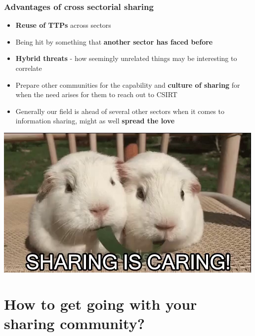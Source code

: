 \begin{frame}
	\frametitle{Advantages of cross sectorial sharing}
	\begin{itemize}
		\item \textbf{Reuse of TTPs} across sectors
		\item Being hit by something that \textbf{another sector has faced before}
		\item \textbf{Hybrid threats} - how seemingly unrelated things may be interesting to correlate
		\item Prepare other communities for the capability and \textbf{culture of sharing} for when the need arises for them to reach out to CSIRT
		\item Generally our field is ahead of several other sectors when it comes to information sharing, might as well \textbf{spread the love}
	\end{itemize}
	\centering\includegraphics[scale=0.3]{../images/sharing.jpeg}
\end{frame}

\section{How to get going with your\\ sharing community?}


